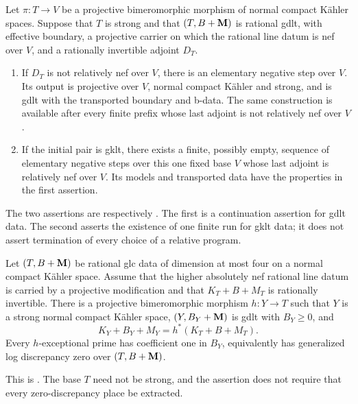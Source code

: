 \begin{proposition}\label{prop:relative-program}
Let \(\pi:T\to V\) be a projective bimeromorphic morphism of normal compact
K\"ahler spaces.  Suppose that \(T\) is strong and that \((T,B+\mathbf{M})\) is
rational gdlt, with effective boundary, a projective carrier on which the
rational line datum is nef over \(V\), and a rationally invertible adjoint
\(D_T\).
\begin{enumerate}
\item If \(D_T\) is not relatively nef over \(V\), there is an elementary
negative step over \(V\).  Its output is projective over \(V\), normal
compact K\"ahler and strong, and is gdlt with the transported boundary and
b-data.  The same construction is available after every finite prefix whose
last adjoint is not relatively nef over \(V\).
\item If the initial pair is gklt, there exists a finite, possibly empty,
sequence of elementary negative steps over this one fixed base \(V\) whose
last adjoint is relatively nef over \(V\).  Its models and transported data
have the properties in the first assertion.
\end{enumerate}
\end{proposition}

The two assertions are respectively
\cite[Propositions~9.7 and 9.9]{KahlerAuxiliary}.  The first is a
continuation assertion for gdlt data.  The second asserts the existence of
one finite run for gklt data; it does not assert termination of every choice
of a relative program.

\begin{proposition}\label{prop:gdlt-modification}
Let \((T,B+\mathbf{M})\) be rational glc data of dimension at most four on a normal
compact K\"ahler space.  Assume that the higher absolutely nef rational
line datum is carried by a projective modification and that
\(K_T+B+M_T\) is rationally invertible.  There is a projective bimeromorphic
morphism \(h:Y\to T\) such that \(Y\) is a strong normal compact K\"ahler
space, \((Y,B_Y+\mathbf{M})\) is gdlt with \(B_Y\geq0\), and
\[
 K_Y+B_Y+M_Y=h^*(K_T+B+M_T).
\]
Every \(h\)-exceptional prime has coefficient one in \(B_Y\), equivalently
has generalized log discrepancy zero over \((T,B+\mathbf{M})\).
\end{proposition}

This is \cite[Proposition~11.4]{KahlerAuxiliary}.  The base \(T\) need not
be strong, and the assertion does not require that every zero-discrepancy
place be extracted.

